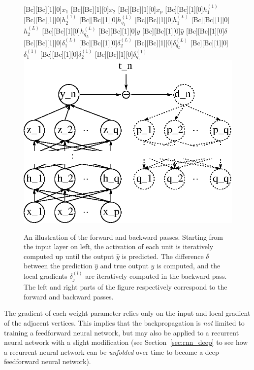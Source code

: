 \documentclass[dissertation,nocontribution,draft*]{aaltoseries}
\begin{document}
\begin{figure}[t]
    \centering
    [Bc][Bc][1][0]{$x_1$}
    [Bc][Bc][1][0]{$x_2$}
    [Bc][Bc][1][0]{$x_p$}
    [Bc][Bc][1][0]{$h^{(1)}_1$}
    [Bc][Bc][1][0]{$h^{(1)}_2$}
    [Bc][Bc][1][0]{$h^{(1)}_{q_1}$}
    [Bc][Bc][1][0]{$h^{(L)}_1$}
    [Bc][Bc][1][0]{$h^{(L)}_2$}
    [Bc][Bc][1][0]{$h^{(L)}_{q_L}$}
    [Bc][Bc][1][0]{$y$}
    [Bc][Bc][1][0]{$\hat{y}$}
    [Bc][Bc][1][0]{$\delta$}
    [Bc][Bc][1][0]{$\delta^{(L)}_1$}
    [Bc][Bc][1][0]{$\delta^{(L)}_2$}
    [Bc][Bc][1][0]{$\delta^{(L)}_{q_L}$}
    [Bc][Bc][1][0]{$\delta^{(1)}_1$}
    [Bc][Bc][1][0]{$\delta^{(1)}_2$}
    [Bc][Bc][1][0]{$\delta^{(1)}_{q_1}$}
    \includegraphics[width=0.75\columnwidth]{figures/mlp_bp.eps}
    \caption{An illustration of the forward and
    backward passes. Starting from the input layer on left,
    the activation of each unit is iteratively computed up
    until the output $\hat{y}$ is predicted. The difference
    $\delta$ between the prediction $\hat{y}$ and true
    output $y$ is computed, and the local gradients
    $\delta_j^{(l)}$ are iteratively computed in the
    backward pass. The left and right parts of the figure
    respectively correspond to the forward and backward
    passes.}
    \label{fig:backprop}
\end{figure}

The gradient of each weight parameter relies only on the
input and local gradient of the adjacent vertices. This
implies that the backpropagation is \textit{not} limited to
training a feedforward neural network, but may also be
applied to a recurrent neural network with a slight
modification (see Section~\ref{sec:rnn_deep} to see how a
recurrent neural network can be \textit{unfolded} over time
to become a deep feedforward neural network). 
\end{document}

